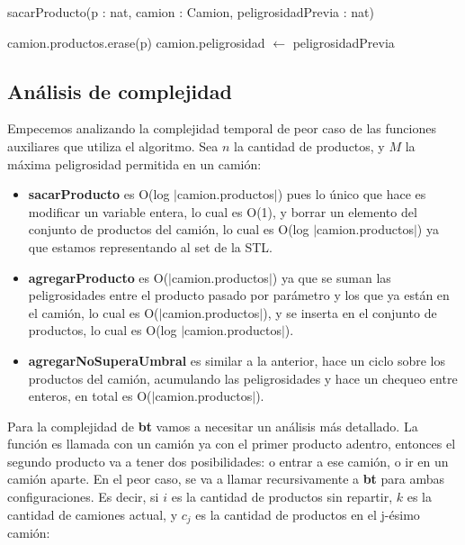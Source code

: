 \begin{algorithm}[H]
\begin{algorithmic}[1]
\caption{sacarProducto(p : nat, camion : Camion, peligrosidadPrevia : nat)}
\STATE camion.productos.erase(p)
\STATE camion.peligrosidad $\leftarrow$ peligrosidadPrevia
\end{algorithmic}
\end{algorithm}



\subsection{An\'alisis de complejidad}
Empecemos analizando la complejidad temporal de peor caso de las funciones auxiliares que utiliza el algoritmo. Sea $n$ la cantidad de productos, y $M$ la máxima peligrosidad permitida en un camión:
\begin{itemize}
	\item \textbf{sacarProducto} es O(log $|$camion.productos$|$) pues lo único que hace es modificar un variable entera, lo cual es O(1), y borrar un elemento del conjunto de productos del camión, lo cual es O(log $|$camion.productos$|$) ya que estamos representando al set de la STL.
	\item \textbf{agregarProducto} es O($|$camion.productos$|$) ya que se suman las peligrosidades entre el producto pasado por parámetro y los que ya están en el camión, lo cual es O($|$camion.productos$|$), y se inserta en el conjunto de productos, lo cual es O(log $|$camion.productos$|$).
	\item \textbf{agregarNoSuperaUmbral} es similar a la anterior, hace un ciclo sobre los productos del camión, acumulando las peligrosidades y hace un chequeo entre enteros, en total es O($|$camion.productos$|$).
\end{itemize}
Para la complejidad de \textbf{bt} vamos a necesitar un análisis más detallado. La función es llamada con un camión ya con el primer producto adentro, entonces el segundo producto va a tener dos posibilidades: o entrar a ese camión, o ir en un camión aparte. En el peor caso, se va a llamar recursivamente a \textbf{bt} para ambas configuraciones. Es decir, si $i$ es la cantidad de productos sin repartir,  $k$ es la cantidad de camiones actual, y $c_j$ es la cantidad de productos en el j-ésimo camión:
